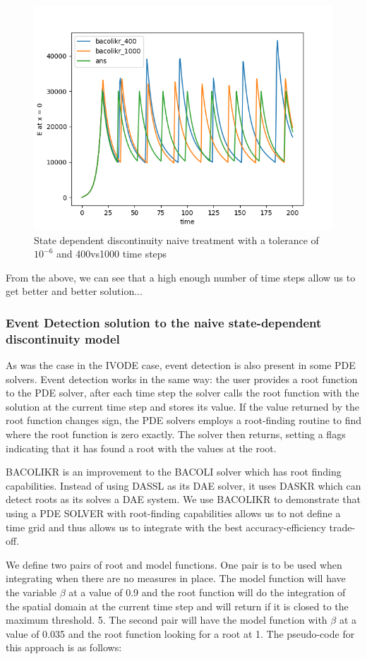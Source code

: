 \documentclass{article}
\begin{document}
\begin{figure}[H]
\centering
\includegraphics[width=0.7\linewidth]{./figures/pde_state_disc_naive_400vs1000}
\caption{State dependent discontinuity naive treatment with a tolerance of $10^{-6}$ and 400vs1000 time steps}
\label{fig:pde_state_disc_naive_400vs1000}
\end{figure}
 
From the above, we can see that a high enough number of time steps allow us to get better and better solution...

\subsubsection{Event Detection solution to the naive state-dependent discontinuity model}
\label{subsubsection:pde_state_event_detection}
As was the case in the IVODE case, event detection is also present in some PDE solvers. Event detection works in the same way: the user provides a root function to the PDE solver, after each time step the solver calls the root function with the solution at the current time step and stores its value. If the value returned by the root function changes sign, the PDE solvers employs a root-finding routine to find where the root function is zero exactly. The solver then returns, setting a flags indicating that it has found a root with the values at the root.
 
BACOLIKR is an improvement to the BACOLI solver which has root finding capabilities. Instead of using DASSL as its DAE solver, it uses DASKR which can detect roots as its solves a DAE system. We use BACOLIKR to demonstrate that using a PDE SOLVER with root-finding capabilities allows us to not define a time grid and thus allows us to integrate with the best accuracy-efficiency trade-off.  

We define two pairs of root and model functions. One pair is to be used when integrating when there are no measures in place. The model function will have the variable $\beta$ at a value of 0.9 and the root function will do the integration of the spatial domain at the current time step and will return if it is closed to the maximum threshold. 5. The second pair will have the model function with $\beta$ at a value of 0.035 and the root function looking for a root at 1. The pseudo-code for this approach is as follows:
\end{document}
